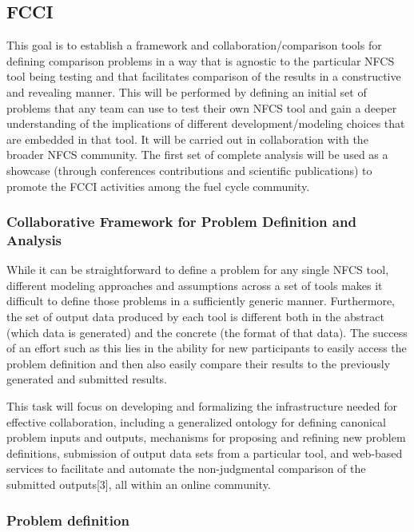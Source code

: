 
\subsection{FCCI}

This goal is to establish a framework and collaboration/comparison tools for
defining comparison problems in a way that is agnostic to the particular NFCS
tool being testing and that facilitates comparison of the results in a
constructive and revealing manner. This will be performed  by defining an
initial set of problems that any team can use to test their own NFCS tool and
gain a deeper understanding of the implications of different
development/modeling choices that are embedded in that tool. It will be carried
out in collaboration with the broader NFCS community. The first set of complete
analysis will be used as a showcase (through conferences contributions and
scientific publications) to promote the FCCI activities among the fuel cycle
community. 


\subsubsection{Collaborative Framework for Problem Definition and Analysis} 

While it can be straightforward to define a problem for any single NFCS tool,
different modeling approaches and assumptions across a set of tools makes it
difficult to define those problems in a sufficiently generic manner.
Furthermore, the set of output data produced by each tool is different both in
the abstract (which data is generated) and the concrete (the format of that
data). The success of an effort such as this lies in the ability for new
participants to easily access the problem definition and then also easily
compare their results to the previously generated and submitted results.

This task will focus on developing and formalizing the infrastructure needed for
effective collaboration, including a generalized ontology for defining canonical
problem inputs and outputs, mechanisms for proposing and refining new problem
definitions, submission of output data sets from a particular tool, and
web-based services to facilitate and automate the non-judgmental comparison of
the submitted outputs[3], all within an online community. 


\subsubsection{Problem definition} 

